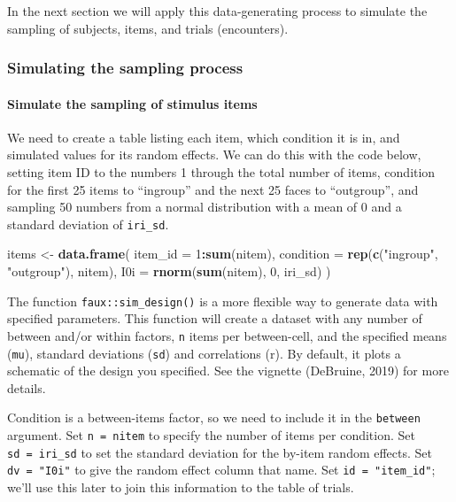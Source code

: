 \documentclass[man,floatsintext]{apa6}
\newenvironment{Shaded}{\begin{snugshade}}{\end{snugshade}}
\newcommand{\KeywordTok}[1]{\textcolor[rgb]{0.13,0.29,0.53}{\textbf{#1}}}
\newcommand{\DataTypeTok}[1]{\textcolor[rgb]{0.13,0.29,0.53}{#1}}
\newcommand{\DecValTok}[1]{\textcolor[rgb]{0.00,0.00,0.81}{#1}}
\newcommand{\StringTok}[1]{\textcolor[rgb]{0.31,0.60,0.02}{#1}}
\newcommand{\OperatorTok}[1]{\textcolor[rgb]{0.81,0.36,0.00}{\textbf{#1}}}
\newcommand{\NormalTok}[1]{#1}
\let\oldparagraph\paragraph
\renewcommand{\paragraph}[1]{\oldparagraph{#1}\mbox{}}
\begin{document}
In the next section we will apply this data-generating process to
simulate the sampling of subjects, items, and trials (encounters).

\subsubsection{Simulating the sampling
process}\label{simulating-the-sampling-process}

\paragraph{Simulate the sampling of stimulus
items}\label{simulate-the-sampling-of-stimulus-items}

We need to create a table listing each item, which condition it is in,
and simulated values for its random effects. We can do this with the
code below, setting item ID to the numbers 1 through the total number of
items, condition for the first 25 items to \enquote{ingroup} and the
next 25 faces to \enquote{outgroup}, and sampling 50 numbers from a
normal distribution with a mean of 0 and a standard deviation of
\texttt{iri\_sd}.

\begin{Shaded}
\begin{Highlighting}[]
\NormalTok{items <-}\StringTok{ }\KeywordTok{data.frame}\NormalTok{(}
  \DataTypeTok{item_id =} \DecValTok{1}\OperatorTok{:}\KeywordTok{sum}\NormalTok{(nitem),}
  \DataTypeTok{condition =} \KeywordTok{rep}\NormalTok{(}\KeywordTok{c}\NormalTok{(}\StringTok{"ingroup"}\NormalTok{, }\StringTok{"outgroup"}\NormalTok{), nitem),}
  \DataTypeTok{I0i =} \KeywordTok{rnorm}\NormalTok{(}\KeywordTok{sum}\NormalTok{(nitem), }\DecValTok{0}\NormalTok{, iri_sd)}
\NormalTok{)}
\end{Highlighting}
\end{Shaded}

The function \texttt{faux::sim\_design()} is a more flexible way to
generate data with specified parameters. This function will create a
dataset with any number of between and/or within factors, \texttt{n}
items per between-cell, and the specified means (\texttt{mu}), standard
deviations (\texttt{sd}) and correlations (r). By default, it plots a
schematic of the design you specified. See the vignette (DeBruine, 2019)
for more details.

Condition is a between-items factor, so we need to include it in the
\texttt{between} argument. Set \texttt{n\ =\ nitem} to specify the
number of items per condition. Set \texttt{sd\ =\ iri\_sd} to set the
standard deviation for the by-item random effects. Set
\texttt{dv\ =\ "I0i"} to give the random effect column that name. Set
\texttt{id\ =\ "item\_id"}; we'll use this later to join this
information to the table of trials.
\end{document}
